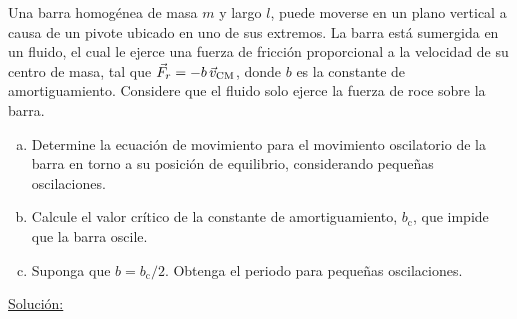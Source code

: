 \item Una barra homogénea de masa $m$ y largo $l$, puede moverse en un plano vertical a causa de un pivote ubicado en uno de sus extremos. La barra está sumergida en un fluido, el cual le ejerce una fuerza de fricción proporcional a la velocidad de su centro de masa, tal que $\vec{F}_{r}=-b\,\vec{v}_{\scriptsize{\text{CM}}}$, donde $b$ es la constante de amortiguamiento. Considere que el fluido solo ejerce la fuerza de roce sobre la barra.
	\begin{figure}[tbph]
		\centering
	\end{figure}
	\begin{enumerate}[a)]
		\item Determine la ecuación de movimiento para el movimiento oscilatorio de la barra en torno a su posición de equilibrio, considerando pequeñas oscilaciones.
		
		\item Calcule el valor crítico de la constante de amortiguamiento, $b_{\text{c}}$, que impide que la barra oscile.
		
		\item Suponga que $b=b_{\text{c}}/2$. Obtenga el periodo para pequeñas oscilaciones.	
	\end{enumerate}

\underline{Soluci\'on:}


